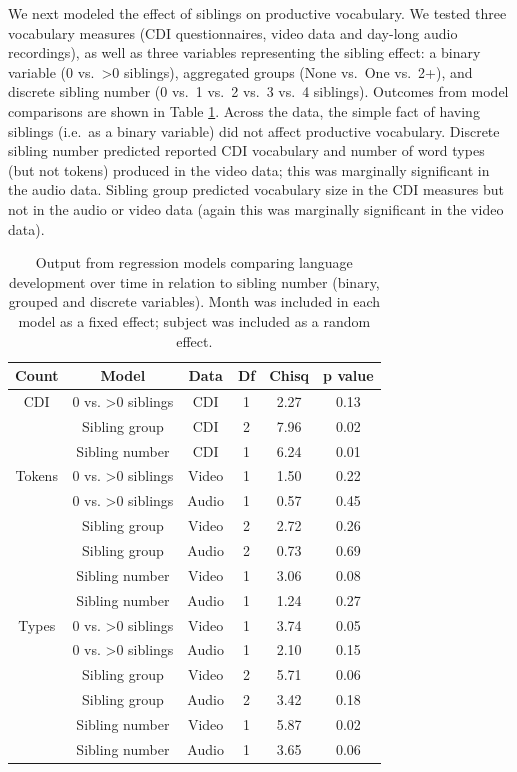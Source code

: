 \documentclass[
  english,
  man,floatsintext]{apa6}
\begin{document}
We next modeled the effect of siblings on productive vocabulary. We tested three vocabulary measures (CDI questionnaires, video data and day-long audio recordings), as well as three variables representing the sibling effect: a binary variable (0 vs.~\textgreater0 siblings), aggregated groups (None vs.~One vs.~2+), and discrete sibling number (0 vs.~1 vs.~2 vs.~3 vs.~4 siblings). Outcomes from model comparisons are shown in Table \ref{tab:table-sibling-model-output}. Across the data, the simple fact of having siblings (i.e.~as a binary variable) did not affect productive vocabulary. Discrete sibling number predicted reported CDI vocabulary and number of word types (but not tokens) produced in the video data; this was marginally significant in the audio data. Sibling group predicted vocabulary size in the CDI measures but not in the audio or video data (again this was marginally significant in the video data).

\begin{longtable}[t]{cccccc}
\caption{\label{tab:table-sibling-model-output}Output from regression models comparing language development over time in relation to sibling number (binary, grouped and discrete variables). Month was included in each model as a fixed effect; subject was included as a random effect.}\\
\toprule
Count & Model & Data & Df & Chisq & p value\\
\midrule
CDI & 0 vs. >0 siblings & CDI & 1 & 2.27 & 0.13\\
 & Sibling group & CDI & 2 & 7.96 & 0.02\\
 & Sibling number & CDI & 1 & 6.24 & 0.01\\
\midrule
Tokens & 0 vs. >0 siblings & Video & 1 & 1.50 & 0.22\\
 & 0 vs. >0 siblings & Audio & 1 & 0.57 & 0.45\\
\addlinespace
 & Sibling group & Video & 2 & 2.72 & 0.26\\
 & Sibling group & Audio & 2 & 0.73 & 0.69\\
 & Sibling number & Video & 1 & 3.06 & 0.08\\
 & Sibling number & Audio & 1 & 1.24 & 0.27\\
\midrule
Types & 0 vs. >0 siblings & Video & 1 & 3.74 & 0.05\\
\addlinespace
 & 0 vs. >0 siblings & Audio & 1 & 2.10 & 0.15\\
 & Sibling group & Video & 2 & 5.71 & 0.06\\
 & Sibling group & Audio & 2 & 3.42 & 0.18\\
 & Sibling number & Video & 1 & 5.87 & 0.02\\
 & Sibling number & Audio & 1 & 3.65 & 0.06\\
\bottomrule
\end{longtable}
\end{document}
